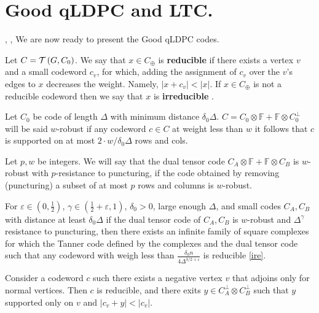 \chapter{Good qLDPC and LTC.}
 \cite{leverrier2022quantum}, \cite{Pavel}, \cite{Dinur}
We are now ready to present the Good qLDPC codes. 
  \begin{definition} Let $C = \mathcal{T}\left( G, C_0 \right)$. We say that $x \in C_{\oplus}$ is \textbf{reducible} if there exists a vertex $v$ and a small codeword $c_v$, for which, adding the assignment of $c_v$ over the $v$'s edges to $x$ decreases the weight. Namely, $|x + c_{v}| < |x|$. If $x \in C_{\oplus}$ is not a reducible codeword then we say that $x$ is \textbf{irreducible} \label{ire}. \end{definition}


\begin{definition}[$w$-Robustness] Let $C_{0}$ be code of length $\Delta$ with minimum distance $\delta_{0}\Delta$. $C = C_{0} \otimes \mathbb{F} + \mathbb{F}\otimes C_{0}^{\perp}$ will be said $w$-robust if any codeword $c \in C$ at weight less than $w$ it follows that $c$ is supported on at most $2\cdot w/\delta_{0}\Delta$ rows and cols.
\end{definition}

\begin{definition} Let $p,w$ be integers. We will say that the dual tensor code $C_{A} \otimes \mathbb{F} + \mathbb{F} \otimes C_{B}$ is $w$-robust with $p$-resistance to puncturing, if the code obtained by removing (puncturing) a subset of at most $p$ rows and columns is $w$-robust.   
\end{definition}

\begin{theorem}
  For $\varepsilon \in \left( 0,\frac{1}{2} \right)$, $\gamma\in \left( \frac{1}{2} + \varepsilon, 1 \right)$, $\delta_{0}> 0$, large enough $\Delta$, and small codes $C_{A},C_{B}$ with distance at least $\delta_{0}\Delta$ if the dual tensor code of $C_{A},C_{B}$ is $w$-robust and $\Delta^{\gamma}$ resistance to puncturing, then there exists an infinite family of square complexes for which the Tanner code defined by the complexes and the dual tensor code such that any codeword with weigh less than $ \frac{\delta_{0} n}{4\Delta^{3/2 + \varepsilon}} $ is reducible \cref{ire}.
\end{theorem}

\begin{claim}
  Consider a codeword $c$ such there exists a negative vertex $v$ that adjoins only for normal vertices. Then $c$ is reducible, and there exits $y \in C_{A}^{\perp}\otimes C_{B}^{\perp}$ such that $y$ supported only on $v$ and $ | c_{v} + y | < |c_{v}| $.       
\end{claim}

